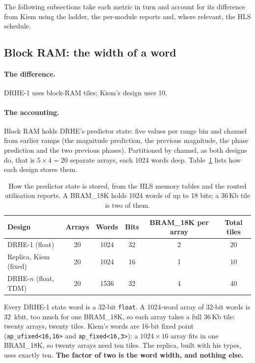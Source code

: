 The following subsections take each metric in turn and account for its
difference from Kiem using the ladder, the per-module reports and, where
relevant, the HLS schedule.

\subsection{Block RAM: the width of a word}
\label{sec:acc_bram}

\paragraph{The difference.} DRHE-1 uses  block-RAM tiles;
Kiem's design uses 10.

\paragraph{The accounting.} Block RAM holds DRHE's predictor state: five values
per range bin and channel from earlier ramps (the magnitude prediction, the
previous magnitude, the phase prediction and the two previous phases).
Partitioned by channel, as both designs do, that is $5 \times 4 = 20$ separate
arrays, each \num{1024} words deep. Table~\ref{tab:memtable} lists how each
design stores them.

\begin{table}[htbp]
\centering
\caption[How the predictor state is stored]{How the predictor state is stored,
from the HLS memory tables and the routed utilisation reports. A BRAM\_18K
holds \num{1024} words of up to 18 bits; a 36\,Kb tile is two of them.}
\label{tab:memtable}
\small
\begin{tabular}{@{}lccccc@{}}
\toprule
Design & Arrays & Words & Bits & BRAM\_18K per array & Total tiles\\
\midrule
DRHE-1 (float)          & 20 & \num{1024} & 32 & 2 & 20\\
Replica, Kiem (fixed)   & 20 & \num{1024} & 16 & 1 & 10\\
DRHE-$n$ (float, TDM)   & 20 & \num{1536} & 32 & 4 & 40\\
\bottomrule
\end{tabular}
\end{table}

\noindent
Every DRHE-1 state word is a 32-bit \texttt{float}. A \num{1024}-word array of
32-bit words is \SI{32}{\kilo bit}, too much for one BRAM\_18K, so each array
takes a full 36\,Kb tile: twenty arrays, twenty tiles. Kiem's words are 16-bit
fixed point (\texttt{ap\_ufixed<16,16>} and \texttt{ap\_fixed<16,3>}); a
$1024 \times 16$ array fits in one BRAM\_18K, so twenty arrays need ten tiles.
The replica, built with his types, uses exactly ten. \textbf{The factor of two
is the word width, and nothing else.}

